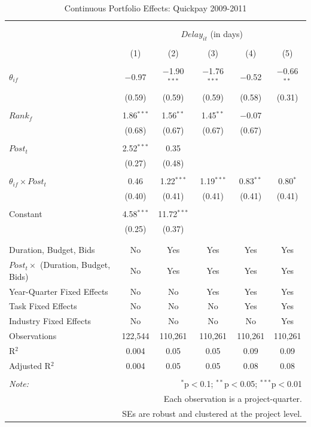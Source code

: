 \documentclass[
]{article}
\begin{document}
\begin{table}[H] \centering 
  \caption{Continuous Portfolio Effects: Quickpay 2009-2011} 
  \label{} 
\small 
\begin{tabular}{@{\extracolsep{-2pt}}lccccc} 
\\[-1.8ex]\hline 
\hline \\[-1.8ex] 
\\[-1.8ex] & \multicolumn{5}{c}{$Delay_{it}$ (in days)} \\ 
\\[-1.8ex] & (1) & (2) & (3) & (4) & (5)\\ 
\hline \\[-1.8ex] 
 $\theta_{if}$ & $-$0.97 & $-$1.90$^{***}$ & $-$1.76$^{***}$ & $-$0.52 & $-$0.66$^{**}$ \\ 
  & (0.59) & (0.59) & (0.59) & (0.58) & (0.31) \\ 
  & & & & & \\ 
 $Rank_f$ & 1.86$^{***}$ & 1.56$^{**}$ & 1.45$^{**}$ & $-$0.07 &  \\ 
  & (0.68) & (0.67) & (0.67) & (0.67) &  \\ 
  & & & & & \\ 
 $Post_t$ & 2.52$^{***}$ & 0.35 &  &  &  \\ 
  & (0.27) & (0.48) &  &  &  \\ 
  & & & & & \\ 
 $\theta_{if} \times Post_t$ & 0.46 & 1.22$^{***}$ & 1.19$^{***}$ & 0.83$^{**}$ & 0.80$^{*}$ \\ 
  & (0.40) & (0.41) & (0.41) & (0.41) & (0.41) \\ 
  & & & & & \\ 
 Constant & 4.58$^{***}$ & 11.72$^{***}$ &  &  &  \\ 
  & (0.25) & (0.37) &  &  &  \\ 
  & & & & & \\ 
\hline \\[-1.8ex] 
Duration, Budget, Bids & No & Yes & Yes & Yes & Yes \\ 
$Post_t \times$  (Duration, Budget, Bids) & No & Yes & Yes & Yes & Yes \\ 
Year-Quarter Fixed Effects & No & No & Yes & Yes & Yes \\ 
Task Fixed Effects & No & No & No & Yes & Yes \\ 
Industry Fixed Effects & No & No & No & No & Yes \\ 
Observations & 122,544 & 110,261 & 110,261 & 110,261 & 110,261 \\ 
R$^{2}$ & 0.004 & 0.05 & 0.05 & 0.09 & 0.09 \\ 
Adjusted R$^{2}$ & 0.004 & 0.05 & 0.05 & 0.08 & 0.08 \\ 
\hline 
\hline \\[-1.8ex] 
\textit{Note:}  & \multicolumn{5}{r}{$^{*}$p$<$0.1; $^{**}$p$<$0.05; $^{***}$p$<$0.01} \\ 
 & \multicolumn{5}{r}{Each observation is a project-quarter.} \\ 
 & \multicolumn{5}{r}{SEs are robust and clustered at the project level.} \\ 
\end{tabular} 
\end{table}
\end{document}

